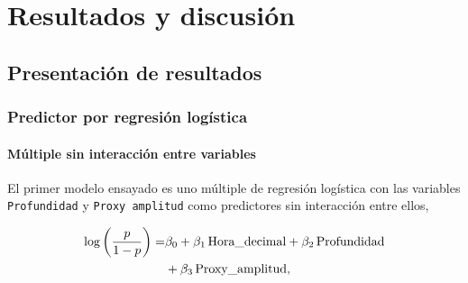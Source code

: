 \documentclass[a4paper]{report}
\begin{document}
%




\chapter{Resultados y discusión}


\section{Presentación de resultados}


\subsection{Predictor por regresión logística}


\subsubsection*{Múltiple sin interacción entre variables}

El primer modelo ensayado es uno múltiple de regresión logística con las variables \lstinline[language = R]'Profundidad' y \lstinline[language = R]'Proxy amplitud' como predictores sin interacción entre ellos,

\begin{align}
	\log \left( \frac{p}{1-p} \right) = &
	 \beta_0 + \beta_1\, \text{Hora\_decimal} + \beta_2 \, \text{Profundidad}\notag\\
	& + \beta_3 \, \text{Proxy\_amplitud},
	\label{eq:regresion_logistica}
\end{align}
\end{document}
